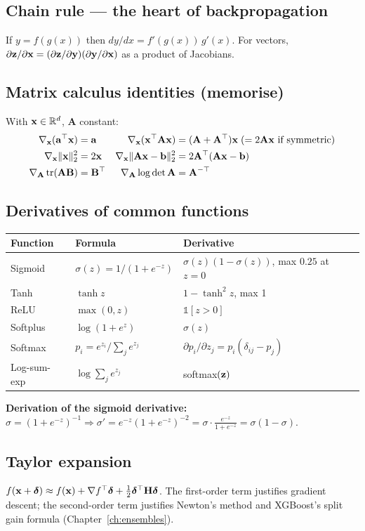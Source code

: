 \subsection{Chain rule --- the heart of backpropagation}
If $y=f(g(x))$ then $dy/dx=f'(g(x))\,g'(x)$. For vectors, $\partial\mathbf{z}/\partial\mathbf{x}=(\partial\mathbf{z}/\partial\mathbf{y})(\partial\mathbf{y}/\partial\mathbf{x})$ as a product of Jacobians.

\subsection{Matrix calculus identities (memorise)}
With $\mathbf{x}\in\mathbb{R}^d$, $\mathbf{A}$ constant:
\begin{align*}
\nabla_{\mathbf{x}}(\mathbf{a}^\top\mathbf{x}) &= \mathbf{a} &
\nabla_{\mathbf{x}}(\mathbf{x}^\top\mathbf{A}\mathbf{x}) &= (\mathbf{A}+\mathbf{A}^\top)\mathbf{x} \;(=2\mathbf{A}\mathbf{x} \text{ if symmetric})\\
\nabla_{\mathbf{x}}\|\mathbf{x}\|_2^2 &= 2\mathbf{x} &
\nabla_{\mathbf{x}}\|\mathbf{A}\mathbf{x}-\mathbf{b}\|_2^2 &= 2\mathbf{A}^\top(\mathbf{A}\mathbf{x}-\mathbf{b})\\
\nabla_{\mathbf{A}}\operatorname{tr}(\mathbf{AB}) &= \mathbf{B}^\top &
\nabla_{\mathbf{A}}\log\det\mathbf{A} &= \mathbf{A}^{-\top}
\end{align*}

\subsection{Derivatives of common functions}
\begin{tabular}{@{}lll@{}}
\toprule
Function & Formula & Derivative\\
\midrule
Sigmoid & $\sigma(z)=1/(1+e^{-z})$ & $\sigma(z)(1-\sigma(z))$, max $0.25$ at $z=0$\\
Tanh & $\tanh z$ & $1-\tanh^2z$, max 1\\
ReLU & $\max(0,z)$ & $\mathbb{1}[z>0]$\\
Softplus & $\log(1+e^z)$ & $\sigma(z)$\\
Softmax & $p_i=e^{z_i}/\sum_je^{z_j}$ & $\partial p_i/\partial z_j=p_i(\delta_{ij}-p_j)$\\
Log-sum-exp & $\log\sum_je^{z_j}$ & softmax$(\mathbf{z})$\\
\bottomrule
\end{tabular}

\textbf{Derivation of the sigmoid derivative:} $\sigma=(1+e^{-z})^{-1}\Rightarrow\sigma'=e^{-z}(1+e^{-z})^{-2}=\sigma\cdot\frac{e^{-z}}{1+e^{-z}}=\sigma(1-\sigma)$.

\subsection{Taylor expansion}
$f(\mathbf{x}+\bm\delta)\approx f(\mathbf{x})+\nabla f^\top\bm\delta+\tfrac12\bm\delta^\top\mathbf{H}\bm\delta$. The first-order term justifies gradient descent; the second-order term justifies Newton's method and XGBoost's split gain formula (Chapter~\ref{ch:ensembles}).

